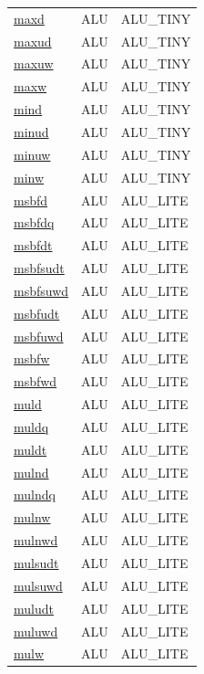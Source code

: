\begin{small}
\begin{longtable}[l]{l l l}
\hyperlink{lvx.maxd}{maxd} & ALU & ALU\_TINY \\ 
\hyperlink{lvx.maxud}{maxud} & ALU & ALU\_TINY \\ 
\hyperlink{lvx.maxuw}{maxuw} & ALU & ALU\_TINY \\ 
\hyperlink{lvx.maxw}{maxw} & ALU & ALU\_TINY \\ 
\hyperlink{lvx.mind}{mind} & ALU & ALU\_TINY \\ 
\hyperlink{lvx.minud}{minud} & ALU & ALU\_TINY \\ 
\hyperlink{lvx.minuw}{minuw} & ALU & ALU\_TINY \\ 
\hyperlink{lvx.minw}{minw} & ALU & ALU\_TINY \\ 
\hyperlink{lvx.msbfd}{msbfd} & ALU & ALU\_LITE \\ 
\hyperlink{lvx.msbfdq}{msbfdq} & ALU & ALU\_LITE \\ 
\hyperlink{lvx.msbfdt}{msbfdt} & ALU & ALU\_LITE \\ 
\hyperlink{lvx.msbfsudt}{msbfsudt} & ALU & ALU\_LITE \\ 
\hyperlink{lvx.msbfsuwd}{msbfsuwd} & ALU & ALU\_LITE \\ 
\hyperlink{lvx.msbfudt}{msbfudt} & ALU & ALU\_LITE \\ 
\hyperlink{lvx.msbfuwd}{msbfuwd} & ALU & ALU\_LITE \\ 
\hyperlink{lvx.msbfw}{msbfw} & ALU & ALU\_LITE \\ 
\hyperlink{lvx.msbfwd}{msbfwd} & ALU & ALU\_LITE \\ 
\hyperlink{lvx.muld}{muld} & ALU & ALU\_LITE \\ 
\hyperlink{lvx.muldq}{muldq} & ALU & ALU\_LITE \\ 
\hyperlink{lvx.muldt}{muldt} & ALU & ALU\_LITE \\ 
\hyperlink{lvx.mulnd}{mulnd} & ALU & ALU\_LITE \\ 
\hyperlink{lvx.mulndq}{mulndq} & ALU & ALU\_LITE \\ 
\hyperlink{lvx.mulnw}{mulnw} & ALU & ALU\_LITE \\ 
\hyperlink{lvx.mulnwd}{mulnwd} & ALU & ALU\_LITE \\ 
\hyperlink{lvx.mulsudt}{mulsudt} & ALU & ALU\_LITE \\ 
\hyperlink{lvx.mulsuwd}{mulsuwd} & ALU & ALU\_LITE \\ 
\hyperlink{lvx.muludt}{muludt} & ALU & ALU\_LITE \\ 
\hyperlink{lvx.muluwd}{muluwd} & ALU & ALU\_LITE \\ 
\hyperlink{lvx.mulw}{mulw} & ALU & ALU\_LITE \\ 

\end{longtable}
\end{small}
